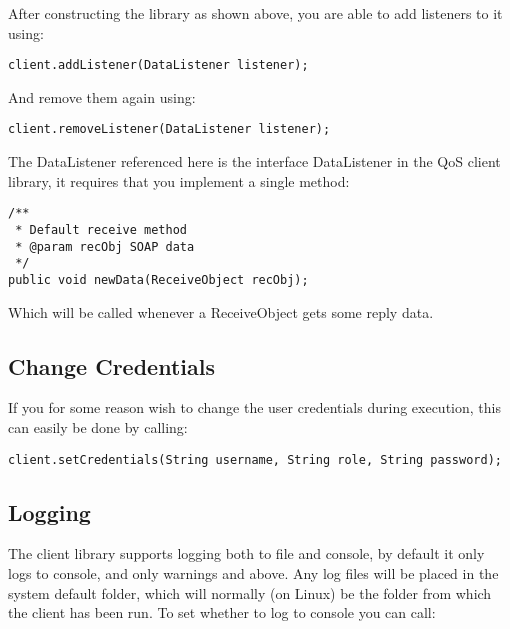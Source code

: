     After constructing the library as shown above, you are able to add listeners to it using:
    
\begin{lstlisting}[caption={Add listener}, label=userguideAddlistener]
    client.addListener(DataListener listener);
\end{lstlisting}

    And remove them again using:
    
\begin{lstlisting}[caption={Remove listener}, label=userguideRemovelistener]
    client.removeListener(DataListener listener);
\end{lstlisting}

    The DataListener referenced here is the interface DataListener in the QoS client library, it requires that you implement a single method:

\begin{lstlisting}[caption={The DataListener interface}, label=userguideDatalistener]
/**
 * Default receive method
 * @param recObj SOAP data
 */
public void newData(ReceiveObject recObj);
\end{lstlisting}

    Which will be called whenever a ReceiveObject gets some reply data.

\subsection{Change Credentials}\label{Change Credentials}
    
    If you for some reason wish to change the user credentials during execution, this can easily be done by calling:
    
\begin{lstlisting}[caption={Changing user credentials}, label=userguideCredentials]
    client.setCredentials(String username, String role, String password);
\end{lstlisting}

\subsection{Logging}\label{userguideLogging}

    The client library supports logging both to file and console, by default it only logs to console, and only warnings and above. Any log files will be placed in the system default folder, which will normally (on Linux) be the folder from which the client has been run. To set whether to log to console you can call:

